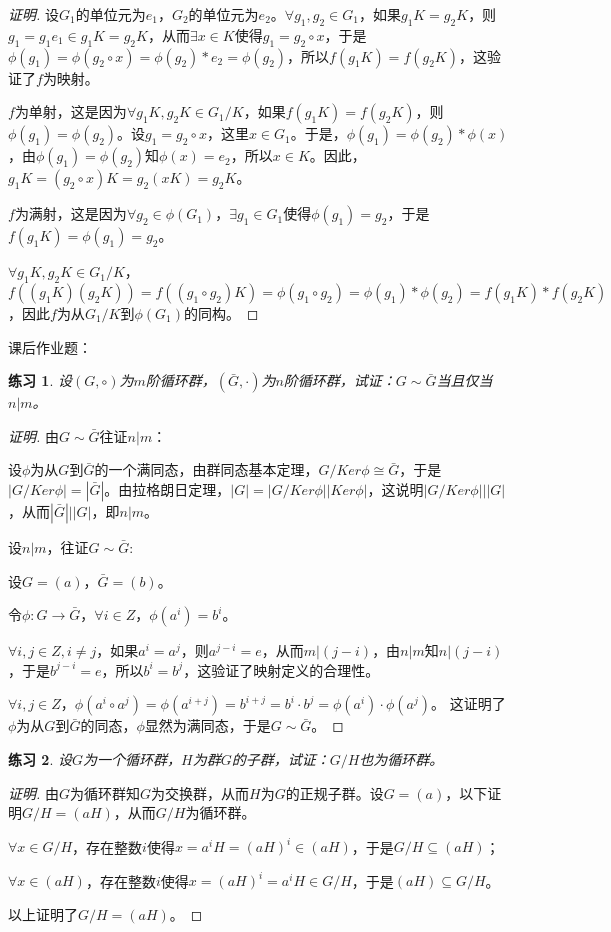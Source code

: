 \documentclass{article}
\newtheorem{Exercise}{练习}
\begin{document}
\begin{CJK*}{UTF8}{gbsn}
\begin{proof}[证明]
  设$G_1$的单位元为$e_1$，$G_2$的单位元为$e_2$。$\forall g_1,g_2\in G_1$，如果$g_1K=g_2K$，则$g_1=g_1e_1\in g_1K=g_2K$，从而$\exists x\in K$使得$g_1=g_2\circ x$，于是$\phi(g_1)=\phi(g_2\circ x)=\phi(g_2)*e_2=\phi(g_2)$，所以$f(g_1K)=f(g_2K)$，这验证了$f$为映射。
  
  $f$为单射，这是因为$\forall g_1K,g_2K\in G_1/K$，如果$f(g_1K)=f(g_2K)$，则$\phi(g_1)=\phi(g_2)$。设$g_1=g_2\circ x$，这里$x\in G_1$。于是，$\phi(g_1)=\phi(g_2)*\phi(x)$，由$\phi(g_1)=\phi(g_2)$知$\phi(x)=e_2$，所以$x\in K$。因此，$g_1K=(g_2\circ x)K=g_2(xK)=g_2K$。
  
  $f$为满射，这是因为$\forall g_2 \in \phi(G_1)$，$\exists g_1\in G_1$使得$\phi(g_1)=g_2$，于是$f(g_1K)=\phi(g_1)=g_2$。
  
  $\forall g_1K,g_2K\in G_1/K$，$f((g_1K)(g_2K))=f((g_1\circ g_2)K)=\phi(g_1\circ g_2)=\phi(g_1)*\phi(g_2)=f(g_1K)*f(g_2K)$，因此$f$为从$G_1/K$到$\phi(G_1)$的同构。
  \end{proof}
  

课后作业题：
\begin{Exercise}
设$(G,\circ)$为$m$阶循环群，$(\bar{G},\cdot)$为$n$阶循环群，试证：$G \sim \bar{G}$当且仅当$n | m$。
\end{Exercise}
\begin{proof}[证明]
由$G\sim \bar{G}$往证$n|m$：

设$\phi$为从$G$到$\bar{G}$的一个满同态，由群同态基本定理，$G/Ker \phi\cong \bar{G}$，于是$|G/Ker \phi|=|\bar{G}|$。由拉格朗日定理，$|G|=|G/Ker \phi||Ker \phi|$，这说明$|G/Ker \phi|||G|$，从而$|\bar{G}|||G|$，即$n|m$。

设$n|m$，往证$G\sim \bar{G}$:

设$G=(a)$，$\bar{G}=(b)$。

令$\phi:G\to \bar{G}$，$\forall i\in Z$，$\phi(a^i)=b^i$。

$\forall i,j\in Z, i\neq j$，如果$a^i=a^j$，则$a^{j-i}=e$，从而$m|(j-i)$，由$n|m$知$n|(j-i)$，于是$b^{j-i}=e$，所以$b^i=b^j$，这验证了映射定义的合理性。

$\forall i,j\in Z$，$\phi(a^i\circ a^j)=\phi(a^{i+j})=b^{i+j} =b^i\cdot b^j=\phi(a^i)\cdot \phi(a^j)$。 
这证明了$\phi$为从$G$到$\bar{G}$的同态，$\phi$显然为满同态，于是$G\sim \bar{G}$。
\end{proof}
\begin{Exercise}
设$G$为一个循环群，$H$为群$G$的子群，试证：$G/H$也为循环群。
\end{Exercise}
\begin{proof}[证明]
由$G$为循环群知$G$为交换群，从而$H$为$G$的正规子群。设$G=(a)$，以下证明$G/H=(aH)$，从而$G/H$为循环群。

$\forall x\in G/H$，存在整数$i$使得$x=a^iH=(aH)^i\in (aH)$，于是$G/H\subseteq (aH)$；

$\forall x\in (aH)$，存在整数$i$使得$x=(aH)^i=a^iH\in G/H$，于是$(aH)\subseteq G/H$。

以上证明了$G/H=(aH)$。
\end{proof}
\end{CJK*}
\end{document}
